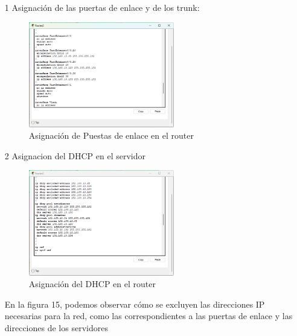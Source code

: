     \begin{enumerate}
        \item [1] Asignación de las puertas de enlace y de los trunk:
        \begin{figure}[H]
            \centering
            \includegraphics[width=0.6\textwidth]{img/Iprouter.png}
            \caption{Asignación de Puestas de enlace en el router}
            \label{fig:routerip}
        \end{figure}
        
        \item [2] Asignacion del DHCP en el servidor
        
        \begin{figure}[H]
            \centering
            \includegraphics[width=0.6\textwidth]{img/dchpRouter.png}
            \caption{Asignación del DHCP en el router}
            \label{fig:routerDhcp}
        \end{figure}
        
        En la figura 15, podemos observar cómo se excluyen las direcciones IP necesarias para la red, como las correspondientes a las puertas de enlace y las direcciones de los servidores 
    \end{enumerate}
